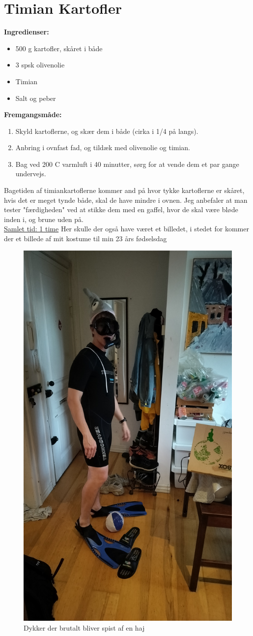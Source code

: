 \documentclass{book}
\begin{document}
\newpage \section{Timian Kartofler}
\begin{minipage}[t]{0.5\textwidth}
\textbf{Ingredienser:}
\begin{itemize}
    \item 500 g kartofler, skåret i både
    \item 3 spsk olivenolie
    \item Timian
    \item Salt og peber
    \end{itemize}
\end{minipage}
\begin{minipage}[t]{0.5\textwidth}
\textbf{Fremgangsmåde:}
\begin{enumerate}
    \item Skyld kartoflerne, og skær dem i både (cirka i 1/4 på langs).
    \item Anbring i ovnfast fad, og tildæk med olivenolie og timian.
    \item Bag ved 200 \degree C varmluft i 40 minutter, sørg for at vende dem et par gange undervejs.
\end{enumerate}
\end{minipage}
Bagetiden af timiankartoflerne kommer and på hvor tykke kartoflerne er skåret, hvis det er meget tynde både, skal de have mindre i ovnen. Jeg anbefaler at man tester "færdigheden" ved at stikke dem med en gaffel, hvor de skal være bløde inden i, og brune uden på.
\\
\underline{Samlet tid: 1 time}
\newpage Her skulle der også have været et billedet, i stedet for kommer der et billede af mit kostume til min 23 års fødselsdag 
\begin{figure}
    \centering
    \includegraphics[width=0.5\linewidth]{Dykke.jpg}
    \caption{Dykker der brutalt bliver spist af en haj}   
\end{figure}
\end{document}

